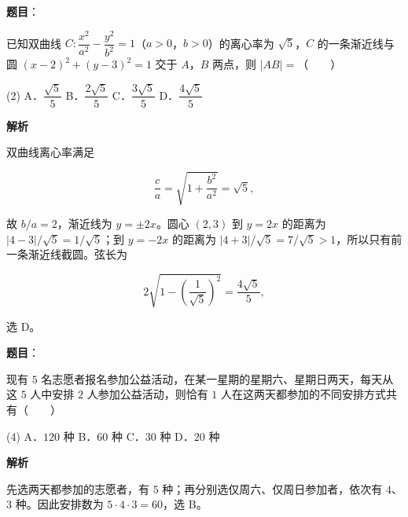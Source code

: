 \begin{answer}

\textbf{题目}：

已知双曲线 $C:\dfrac{x^2}{a^2}-\dfrac{y^2}{b^2}=1$（$a>0$，$b>0$）的离心率为 $\sqrt5$，$C$ 的一条渐近线与圆 $(x-2)^2+(y-3)^2=1$ 交于 $A$，$B$ 两点，则 $|AB|=$\mbox{（　　）}

\begin{gkopts}(2)
\task A．$\dfrac{\sqrt5}{5}$
\task B．$\dfrac{2\sqrt5}{5}$
\task C．$\dfrac{3\sqrt5}{5}$
\task D．$\dfrac{4\sqrt5}{5}$
\end{gkopts}

\textbf{解析}

双曲线离心率满足

\nopagebreak[4]
\[
\frac ca=\sqrt{1+\frac{b^2}{a^2}}=\sqrt5,
\]

故 $b/a=2$，渐近线为 $y=\pm2x$。圆心 $(2,3)$ 到 $y=2x$ 的距离为 $|4-3|/\sqrt5=1/\sqrt5$；到 $y=-2x$ 的距离为 $|4+3|/\sqrt5=7/\sqrt5>1$，所以只有前一条渐近线截圆。弦长为

\nopagebreak[4]
\[
2\sqrt{1-\left(\frac1{\sqrt5}\right)^2}=\frac{4\sqrt5}{5},
\]

选 D。


\end{answer}
\begin{answer}

\textbf{题目}：

现有 $5$ 名志愿者报名参加公益活动，在某一星期的星期六、星期日两天，每天从这 $5$ 人中安排 $2$ 人参加公益活动，则恰有 $1$ 人在这两天都参加的不同安排方式共有\mbox{（　　）}

\begin{gkopts}(4)
\task A．$120$ 种
\task B．$60$ 种
\task C．$30$ 种
\task D．$20$ 种
\end{gkopts}

\textbf{解析}

先选两天都参加的志愿者，有 $5$ 种；再分别选仅周六、仅周日参加者，依次有 $4$、$3$ 种。因此安排数为 $5\cdot4\cdot3=60$，选 B。


\end{answer}
